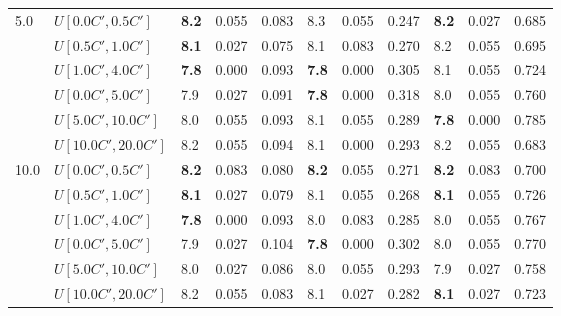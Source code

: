 \begin{table}[h]
{\begin{tabular}{|l|l||l|l|l||l|l|l||l|l|l|}
      \hline\hline
      \multirow{6}{*}{5.0} & $U[0.0C',0.5C']$ & \textbf{8.2} & 0.055 & 0.083 & 8.3 & 0.055 & 0.247 & \textbf{8.2} & 0.027 & 0.685 \\
       & $U[0.5C',1.0C']$ & \textbf{8.1} & 0.027 & 0.075 & 8.1 & 0.083 & 0.270 & 8.2 & 0.055 & 0.695 \\
       & $U[1.0C',4.0C']$ & \textbf{7.8} & 0.000 & 0.093 & \textbf{7.8} & 0.000 & 0.305 & 8.1 & 0.055 & 0.724 \\
       & $U[0.0C',5.0C']$ & 7.9 & 0.027 & 0.091 & \textbf{7.8} & 0.000 & 0.318 & 8.0 & 0.055 & 0.760 \\
       & $U[5.0C',10.0C']$ & 8.0 & 0.055 & 0.093 & 8.1 & 0.055 & 0.289 & \textbf{7.8} & 0.000 & 0.785 \\
       & $U[10.0C',20.0C']$ & 8.2 & 0.055 & 0.094 & 8.1 & 0.000 & 0.293 & 8.2 & 0.055 & 0.683 \\
      \hline\hline
      \multirow{6}{*}{10.0} & $U[0.0C',0.5C']$ & \textbf{8.2} & 0.083 & 0.080 & \textbf{8.2} & 0.055 & 0.271 & \textbf{8.2} & 0.083 & 0.700 \\
       & $U[0.5C',1.0C']$ & \textbf{8.1} & 0.027 & 0.079 & 8.1 & 0.055 & 0.268 & \textbf{8.1} & 0.055 & 0.726 \\
       & $U[1.0C',4.0C']$ & \textbf{7.8} & 0.000 & 0.093 & 8.0 & 0.083 & 0.285 & 8.0 & 0.055 & 0.767 \\
       & $U[0.0C',5.0C']$ & 7.9 & 0.027 & 0.104 & \textbf{7.8} & 0.000 & 0.302 & 8.0 & 0.055 & 0.770 \\
       & $U[5.0C',10.0C']$ & 8.0 & 0.027 & 0.086 & 8.0 & 0.055 & 0.293 & 7.9 & 0.027 & 0.758 \\
       & $U[10.0C',20.0C']$ & 8.2 & 0.055 & 0.083 & 8.1 & 0.027 & 0.282 & \textbf{8.1} & 0.027 & 0.723 \\
      \hline
      \end{tabular}
      }
      \label{tab:pcpn90RecoloredTT}\end{table}
 
